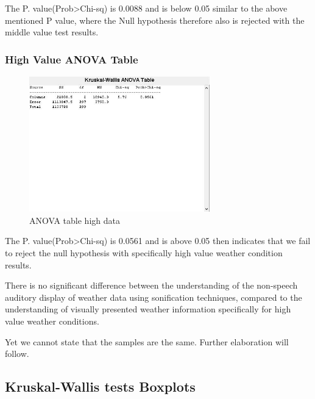 The P. value(Prob>Chi-sq) is 0.0088 and is below 0.05 similar to the above mentioned P value, where the Null hypothesis therefore also is rejected with the middle value test results.



\subsubsection*{High Value ANOVA Table} %
\label{ssub:high_value_anova_table}

\begin{figure}[!htbp]
    \centering
    \includegraphics[width=0.7\textwidth]{images/Evaluation6.jpg}
    \caption{ANOVA table high data}
    \label{fig:evaluation6}
\end{figure}

The P. value(Prob>Chi-sq) is 0.0561 and is above 0.05 then indicates that we fail to reject the null hypothesis with specifically high value weather condition results.

There is no significant difference between the understanding of the non-speech auditory display of weather data using sonification techniques, compared to the understanding of visually presented weather information specifically for high value weather conditions.

Yet we cannot state that the samples are the same. Further elaboration will follow.




\subsection{Kruskal-Wallis tests Boxplots} %
\label{sub:kruskal_wallis_tests_boxplots}


